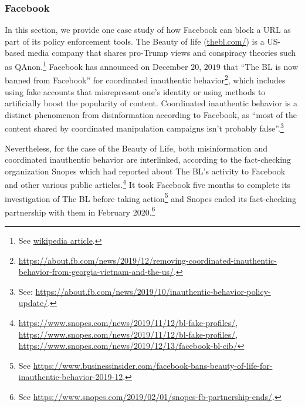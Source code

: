 \documentclass{article}
\begin{document}
\subsubsection{Facebook}

In this section, we provide one case study of how Facebook can block a URL as part of its policy enforcement tools. The Beauty of life (\href{https://thebl.com/}{thebl.com/}) is a US-based media company that shares pro-Trump views and conspiracy theories such as QAnon.\footnote{ See \href{https://en.wikipedia.org/wiki/The\_Epoch\_Times\#Removal\_of\_The\_BL\_(The\_Beauty\_of\_Life)\_from\_Facebook}{wikipedia article}.} Facebook has announced on December $20$, $2019$ that ``The BL is now banned from Facebook'' for coordinated inauthentic behavior\footnote{\href{https://about.fb.com/news/2019/12/removing-coordinated-inauthentic-behavior-from-georgia-vietnam-and-the-us/}{https://about.fb.com/news/2019/12/removing-coordinated-inauthentic-behavior-from-georgia-vietnam-and-the-us/}.}, which includes using fake accounts that misrepresent one's identity or using methods to artificially boost the popularity of content. Coordinated inauthentic behavior is a distinct phenomenon from disinformation according to Facebook, as ``most of the content shared by coordinated manipulation campaigns isn’t probably false”.\footnote{See: \href{https://about.fb.com/news/2019/10/inauthentic-behavior-policy-update/}{https://about.fb.com/news/2019/10/inauthentic-behavior-policy-update/}.}

Nevertheless, for the case of the Beauty of Life, both misinformation and coordinated inauthentic behavior are interlinked, according to the fact-checking organization Snopes which had reported about The BL’s activity to Facebook and other various public articles.\footnote{\href{ https://www.snopes.com/news/2019/11/12/bl-fake-profiles/}{ https://www.snopes.com/news/2019/11/12/bl-fake-profiles/}, \href{https://www.snopes.com/news/2019/11/12/bl-fake-profiles/}{https://www.snopes.com/news/2019/11/12/bl-fake-profiles/}, \href{https://www.snopes.com/news/2019/12/13/facebook-bl-cib/}{https://www.snopes.com/news/2019/12/13/facebook-bl-cib/}} It took Facebook five months to complete its investigation of The BL before taking action\footnote{See \href{https://www.businessinsider.com/facebook-bans-beauty-of-life-for-inauthentic-behavior-2019-12}{https://www.businessinsider.com/facebook-bans-beauty-of-life-for-inauthentic-behavior-2019-12}.} and Snopes ended its fact-checking partnership with them in February 2020.\footnote{See \href{https://www.snopes.com/2019/02/01/snopes-fb-partnership-ends/}{https://www.snopes.com/2019/02/01/snopes-fb-partnership-ends/}.}
\end{document}
